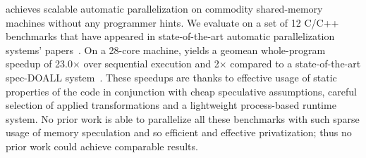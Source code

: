 \name achieves scalable automatic parallelization on commodity
shared-memory machines without any programmer hints.  We evaluate \name
on a set of 12 C/C++ benchmarks that have appeared in state-of-the-art
automatic parallelization systems'
papers~\cite{johnson:12:pldi,kim:12:cgo,campanoni:12:cgo}. On a
28-core machine, \name yields a geomean whole-program speedup of
23.0$\times$ over sequential execution and 2$\times$ compared to a
state-of-the-art spec-DOALL system~\cite{johnson:12:pldi}.
These speedups are thanks to effective usage of static properties of
the code in conjunction with cheap speculative assumptions,
%
careful selection of applied transformations and a lightweight
process-based runtime system.  No prior work is able to parallelize
all these benchmarks with such sparse usage of memory speculation and
so efficient and effective privatization; thus no prior work could
achieve comparable results.
